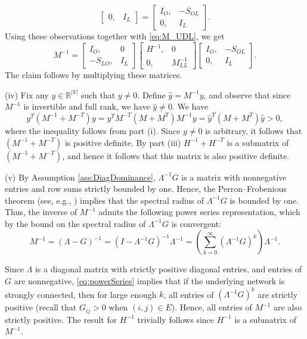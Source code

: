 \documentclass[opre,nonblindrev]{informs3} %
\begin{document}
\begin{APPENDIX}{}
$$\begin{bmatrix}
0  , & I_L
\end{bmatrix}
=
\begin{bmatrix}
I_O, & -S_{OL}  \\
0  , & I_L
\end{bmatrix}.
$$
Using these observations together with \eqref{eq:M_UDL}, we get
\begin{equation}
M^{-1}= \begin{bmatrix}
I_{O}, &  0\\
-S_{LO}, & I_{L}
\end{bmatrix}
\begin{bmatrix}
H^{-1}, &  0\\
0, & M_{LL}^{-1}
\end{bmatrix}
\begin{bmatrix}
I_O, & -S_{OL}  \\
0  , & I_L
\end{bmatrix}.
\end{equation}
The claim follows by  multiplying these matrices.

(iv) Fix any ${y}\in \mathbb{R}^{|V|}$ such that
${y}\neq 0$.
Define $\hat{{y}}=M^{-1}{y}$, and observe that since $M^{-1}$ is invertible and full rank, we have $\hat{{y}}\neq 0$.
We have
\[{y}^T (M^{-1}+M^{-T}) {y} =
{y}^T M^{-T} (M+M^T) M^{-1} {y}=
\hat{{y}}^{T}
(M+M^T) \hat{{y}}>0,\]
where the inequality follows from part (i).
Since ${y}\neq 0$ is arbitrary, it follows that $(M^{-1}+M^{-T}) $ is positive definite.
By part (iii) $H^{-1}+H^{-T}$ is a submatrix of $(M^{-1}+M^{-T}) $, and hence it follows that this matrix is also positive definite.

(v)
By  Assumption \ref{ass:DiagDominance}, $\Lambda^{-1}G$ is a matrix with nonnegative entries and row sums strictly bounded by one. Hence,
the Perron--Frobenious theorem (see, e.g., \citet{horn2012matrix})  implies that the spectral radius of $\Lambda^{-1}G$ is bounded by one. Thus, the inverse of $M^{-1}$ admits the following power series representation, which by the bound on the spectral radius of $\Lambda^{-1}G$ is convergent:
\begin{equation}\label{eq:powerSeries}
M^{-1}=(\Lambda-G)^{-1}=(I-\Lambda^{-1} G)^{-1} \Lambda^{-1}=  \left(\sum_{k=0}^{\infty} (\Lambda^{-1}G)^k \right) \Lambda^{-1}.
\end{equation}

Since $\Lambda$ is a diagonal matrix with strictly positive diagonal entries, and entries of $G$ are nonnegative, \eqref{eq:powerSeries} implies that if the underlying network is strongly connected, then for large enough $k$,  all entries of $(\Lambda^{-1} G)^k$ are strictly positive (recall that $G_{ij}>0$ when $(i,j)\in E$).
Hence,  all entries of $M^{-1}$ are also strictly positive.
The result for $H^{-1}$ trivially follows since $H^{-1}$ is a submatrix of $M^{-1}$.


\end{APPENDIX}
\end{document}
